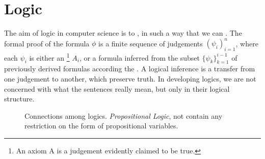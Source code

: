\chapter{Logic}

The aim of logic in computer science is to , in such a way that we can .
The formal proof of the formula $\phi$ is a finite sequence of judgements $(\psi_i)^n_{i=1}$, where each $\psi_i$ is either an \footnote{An axiom A is a judgement evidently claimed to be true.}  $A_i$, or a formula inferred from the subset $\{\psi_k\}_{k=1}^{i-1}$ of previously derived formulas according the .
A logical inference is a transfer from one judgement to another, which preserve truth.
In developing logics, we are not concerned with what the sentences really mean, but only in their logical structure.

\begin{figure}[ht]
  \centering
  
  \caption{Connections among logics. \textit{Propositional Logic}, not contain any restriction on the form of propositional variables.}
  \label{fig:conn-logics}
\end{figure}


